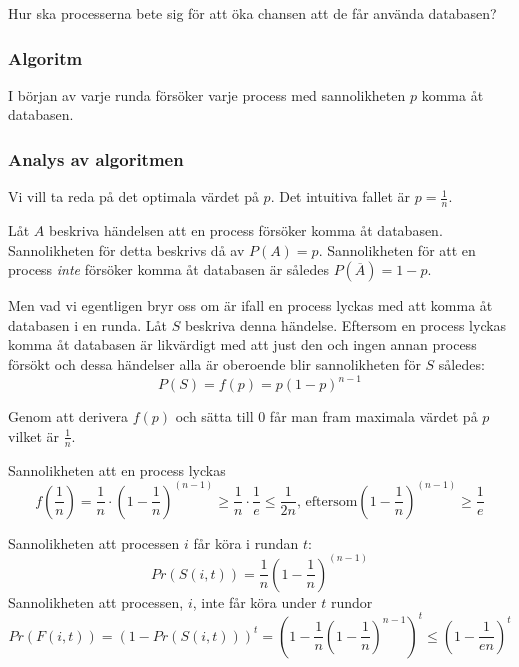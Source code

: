 \documentclass[a4paper]{report}
\begin{document}
Hur ska processerna bete sig för att öka chansen att de får använda databasen?

\subsubsection{Algoritm}
I början av varje runda försöker varje process med sannolikheten $p$ komma åt
databasen.

\subsubsection{Analys av algoritmen}
Vi vill ta reda på det optimala värdet på $p$. Det intuitiva fallet är $p =
\frac{1}{n}$.

Låt $A$ beskriva händelsen att en process försöker komma åt databasen. Sannolikheten för detta beskrivs då av $P(A) = p$. Sannolikheten för att en process \emph{inte} försöker komma åt databasen är således $P(\overline{A}) = 1 - p$. 

Men vad vi egentligen bryr oss om är ifall en process lyckas med att komma åt databasen i en runda. Låt $S$ beskriva denna händelse. Eftersom en process lyckas komma åt databasen är likvärdigt med att just den och ingen annan process försökt och dessa händelser alla är oberoende blir sannolikheten för $S$ således:
\begin{equation}
	P(S) = f(p) = p(1-p)^{n-1}
\end{equation}

Genom att derivera $f(p)$ och sätta till $0$ får man fram maximala värdet på
$p$ vilket är $\frac{1}{n}$.



Sannolikheten att en process lyckas
\begin{equation}
	f(\frac{1}{n}) = \frac{1}{n} \cdot (1 - \frac{1}{n})^{(n-1)} \geq
	\frac{1}{n} \cdot \frac{1}{e} \leq \frac{1}{2n}\mbox{, eftersom} (1 -
	\frac{1}{n})^{(n-1)} \geq \frac{1}{e}
\end{equation}

Sannolikheten att processen $i$ får köra i rundan $t$:
\begin{equation}
	Pr(S(i,t)) = \frac{1}{n}(1 - \frac{1}{n})^{(n-1)}
\end{equation}
Sannolikheten att processen, $i$, inte får köra under $t$ rundor
\begin{equation}
	Pr(F(i,t)) = (1 - Pr(S(i,t)))^t = (1 - \frac{1}{n}(1 -
	\frac{1}{n})^{n-1})^t \leq (1 - \frac{1}{en})^t
\end{equation}
\end{document}
